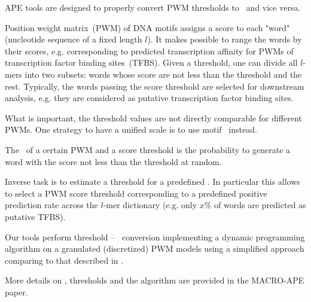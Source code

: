 APE tools are designed to properly convert PWM thresholds to \pvalues\ and vice versa.

Position weight matrix~(PWM) of DNA motifs assigns a score to each "word" (nucleotide sequence of a fixed length $l$). It makes 
possible to range the words by their scores, e.g. corresponding to predicted transcription affinity for PWMs of transcription factor binding sites~(TFBS). Given a threshold, one can divide all $l$-mers into two subsets: words whose score are not less than the threshold and the rest. Typically, the words passing the score threshold are selected for downstream analysis, e.g. they are considered as putative transcription factor binding sites. 

What is important, the threshold values are not directly comparable for different PWMs. One strategy to have a unified scale is to use motif \pvalues\ instead.

The \pvalue\ of a certain PWM and a score threshold is the probability to generate a word with the score not less than the threshold at random.

Inverse task is to estimate a threshold for a predefined \pvalue. In particular this allows to select a PWM score threshold corresponding to a predefined positive prediction rate across the $l$-mer dictionary (e.g. only $x\%$ of words are predicted as putative TFBS).

Our tools perform threshold -- \pvalue\ conversion implementing a dynamic programming algorithm on a granulated (discretized) PWM models using a simplified approach comparing to that described in \cite{Touzet2007}.

More details on \pvalues, thresholds and the algorithm are provided in the MACRO-APE paper. \cite{MACROAPE} 
